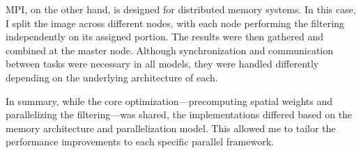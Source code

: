 \documentclass[12pt,a4paper]{report}
\begin{document}
MPI, on the other hand, is designed for distributed memory systems. In this case, I split the image across different nodes, with each node performing the filtering independently on its assigned portion. The results were then gathered and combined at the master node. Although synchronization and communication between tasks were necessary in all models, they were handled differently depending on the underlying architecture of each.

In summary, while the core optimization—precomputing spatial weights and parallelizing the filtering—was shared, the implementations differed based on the memory architecture and parallelization model. This allowed me to tailor the performance improvements to each specific parallel framework.
\end{document}
